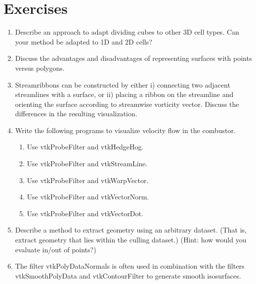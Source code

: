 \printbibliography

\section{Exercises}

\begin{enumerate}

\item Describe an approach to adapt dividing cubes to other 3D cell types. Can your method be adapted to 1D and 2D cells?

\item Discuss the advantages and disadvantages of representing surfaces with points versus polygons.

\item Streamribbons can be constructed by either i) connecting two adjacent streamlines with a surface, or ii) placing a ribbon on the streamline and orienting the surface according to streamwise vorticity vector. Discuss the differences in the resulting visualization.

\item Write the following programs to visualize velocity flow in the combustor.

    \begin{enumerate}

    \item Use vtkProbeFilter and vtkHedgeHog.

    \item Use vtkProbeFilter and vtkStreamLine.

    \item Use vtkProbeFilter and vtkWarpVector.

    \item Use vtkProbeFilter and vtkVectorNorm.

    \item Use vtkProbeFilter and vtkVectorDot.

    \end{enumerate}

\item Describe a method to extract geometry using an arbitrary dataset. (That is, extract geometry that lies within the culling dataset.) (Hint: how would you evaluate in/out of points?)

\item The filter vtkPolyDataNormals is often used in combination with the filters vtkSmoothPolyData and vtkContourFilter to generate smooth isosurfaces.


\end{enumerate}
